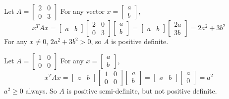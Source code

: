\documentclass{article}
\begin{document}
Let
$
A = \begin{bmatrix}
2 & 0 \\
0 & 3
\end{bmatrix}
$
For any vector $x = \begin{bmatrix} a \\ b \end{bmatrix}$,
\[
x^T A x = \begin{bmatrix} a & b \end{bmatrix}
\begin{bmatrix} 2 & 0 \\ 0 & 3 \end{bmatrix}
\begin{bmatrix} a \\ b \end{bmatrix}
= \begin{bmatrix} a & b \end{bmatrix} \begin{bmatrix} 2a \\ 3b \end{bmatrix}
= 2a^2 + 3b^2
\]
For any $x \neq 0$, $2a^2 + 3b^2 > 0$, so $A$ is positive definite.



Let $A = \begin{bmatrix}
1 & 0 \\
0 & 0
\end{bmatrix}
$
For any $x = \begin{bmatrix} a \\ b \end{bmatrix}$,
\[
x^T A x = \begin{bmatrix} a & b \end{bmatrix}
\begin{bmatrix} 1 & 0 \\ 0 & 0 \end{bmatrix}
\begin{bmatrix} a \\ b \end{bmatrix}
= \begin{bmatrix} a & b \end{bmatrix}
\begin{bmatrix} a \\ 0 \end{bmatrix}
= a^2
\]
$a^2 \geq 0$ always. So $A$ is positive semi-definite, but not positive definite.
\end{document}
